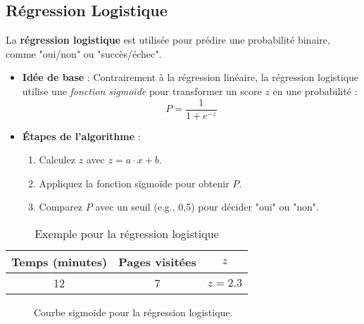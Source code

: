 \subsection{Régression Logistique}
La \textbf{régression logistique} est utilisée pour prédire une probabilité binaire, comme "oui/non" ou "succès/échec".

\begin{itemize}
	\item \textbf{Idée de base} : Contrairement à la régression linéaire, la régression logistique utilise une \textit{fonction sigmoïde} pour transformer un score $z$ en une probabilité :
	\[
	P = \frac{1}{1 + e^{-z}}
	\]
	\item \textbf{Étapes de l’algorithme} :
	\begin{enumerate}
		\item Calculez $z$ avec $z = a \cdot x + b$.
		\item Appliquez la fonction sigmoïde pour obtenir $P$.
		\item Comparez $P$ avec un seuil (e.g., 0,5) pour décider "oui" ou "non".
	\end{enumerate}
\end{itemize}

\begin{table}[h]
	\centering
	\caption{Exemple pour la régression logistique}
	\begin{tabular}{|c|c|c|}
		\hline
		Temps (minutes) & Pages visitées & $z$ \\ \hline
		12              & 7              & $z = 2.3$ \\ \hline
	\end{tabular}
\end{table}

\begin{figure}[h]
	\centering
	\caption{Courbe sigmoïde pour la régression logistique.}
\end{figure}

